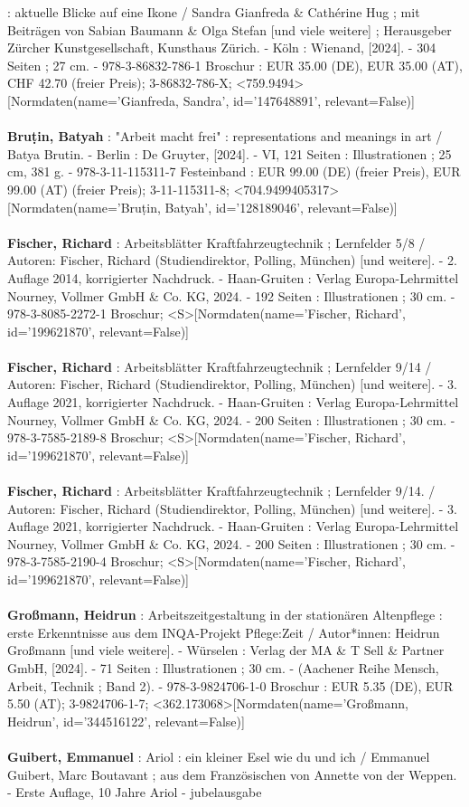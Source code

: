 \documentclass{article}
\begin{document}
\begin{multicols}{3}
: aktuelle Blicke auf eine Ikone / Sandra Gianfreda \& Cathérine Hug ; mit Beiträgen von Sabian Baumann \& Olga Stefan [und viele weitere] ; Herausgeber Zürcher Kunstgesellschaft, Kunsthaus Zürich. - Köln : Wienand, [2024]. - 304 Seiten ; 27 cm. - 978-3-86832-786-1 Broschur : EUR 35.00 (DE), EUR 35.00 (AT), CHF 42.70 (freier Preis); 3-86832-786-X; <759.9494>[Normdaten(name='Gianfreda, Sandra', id='147648891', relevant=False)]\\\\\textbf{Bruṭin, Batyah} : "Arbeit macht frei" : representations and meanings in art / Batya Brutin. - Berlin : De Gruyter, [2024]. - VI, 121 Seiten : Illustrationen ; 25 cm, 381 g. - 978-3-11-115311-7 Festeinband : EUR 99.00 (DE) (freier Preis), EUR 99.00 (AT) (freier Preis); 3-11-115311-8; <704.9499405317>[Normdaten(name='Bruṭin, Batyah', id='128189046', relevant=False)]\\\\\textbf{Fischer, Richard} : Arbeitsblätter Kraftfahrzeugtechnik ; Lernfelder 5/8 / Autoren: Fischer, Richard (Studiendirektor, Polling, München) [und weitere]. - 2. Auflage 2014, korrigierter Nachdruck. - Haan-Gruiten : Verlag Europa-Lehrmittel Nourney, Vollmer GmbH \& Co. KG, 2024. - 192 Seiten : Illustrationen ; 30 cm. - 978-3-8085-2272-1 Broschur; <S>[Normdaten(name='Fischer, Richard', id='199621870', relevant=False)]\\\\\textbf{Fischer, Richard} : Arbeitsblätter Kraftfahrzeugtechnik ; Lernfelder 9/14 / Autoren: Fischer, Richard (Studiendirektor, Polling, München) [und weitere]. - 3. Auflage 2021, korrigierter Nachdruck. - Haan-Gruiten : Verlag Europa-Lehrmittel Nourney, Vollmer GmbH \& Co. KG, 2024. - 200 Seiten : Illustrationen ; 30 cm. - 978-3-7585-2189-8 Broschur; <S>[Normdaten(name='Fischer, Richard', id='199621870', relevant=False)]\\\\\textbf{Fischer, Richard} : Arbeitsblätter Kraftfahrzeugtechnik ; Lernfelder 9/14. / Autoren: Fischer, Richard (Studiendirektor, Polling, München) [und weitere]. - 3. Auflage 2021, korrigierter Nachdruck. - Haan-Gruiten : Verlag Europa-Lehrmittel Nourney, Vollmer GmbH \& Co. KG, 2024. - 200 Seiten : Illustrationen ; 30 cm. - 978-3-7585-2190-4 Broschur; <S>[Normdaten(name='Fischer, Richard', id='199621870', relevant=False)]\\\\\textbf{Großmann, Heidrun} : Arbeitszeitgestaltung in der stationären Altenpflege : erste Erkenntnisse aus dem INQA-Projekt Pflege:Zeit / Autor*innen: Heidrun Großmann [und viele weitere]. - Würselen : Verlag der MA \& T Sell \& Partner GmbH, [2024]. - 71 Seiten : Illustrationen ; 30 cm. - (Aachener Reihe Mensch, Arbeit, Technik ; Band 2). - 978-3-9824706-1-0 Broschur : EUR 5.35 (DE), EUR 5.50 (AT); 3-9824706-1-7; <362.173068>[Normdaten(name='Großmann, Heidrun', id='344516122', relevant=False)]\\\\\textbf{Guibert, Emmanuel} : Ariol : ein kleiner Esel wie du und ich / Emmanuel Guibert, Marc Boutavant ; aus dem Französischen von Annette von der Weppen. - Erste Auflage, 10 Jahre Ariol - jubelausgabe 
\end{multicols}
\end{document}
